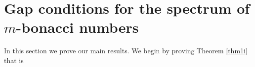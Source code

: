 \documentclass{amsart}
\newtheorem{example}[theorem]{Example}
\begin{document}



\section{Gap conditions for the spectrum of $m$-bonacci numbers }\label{sec3}
In this section we prove our main results. We begin by proving Theorem \ref{thm1i} that is 
\end{document}
